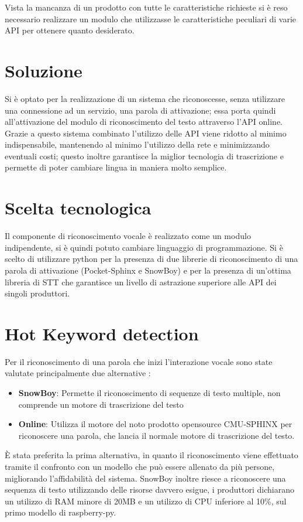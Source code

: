 \documentclass[twoside]{supsistudent}
\begin{document}
Vista la mancanza di un prodotto con tutte le caratteristiche richieste si è reso necessario realizzare un modulo che utilizzasse le caratteristiche peculiari di varie API per ottenere quanto desiderato.


\section{Soluzione}
Si è optato per la realizzazione di un sistema che riconoscesse, senza utilizzare una connessione ad un servizio, una parola di attivazione; essa porta quindi all'attivazione del modulo di riconoscimento del testo attraverso l'API online.\\
Grazie a questo sistema combinato l'utilizzo delle API viene ridotto al minimo indispensabile, mantenendo al minimo l'utilizzo della rete e minimizzando eventuali costi; questo inoltre garantisce la miglior tecnologia di trascrizione e permette di poter cambiare lingua in maniera molto semplice.
\section{Scelta tecnologica}
Il componente di riconoscimento vocale è realizzato come un modulo indipendente, si è quindi potuto cambiare linguaggio di programmazione.
Si è scelto di utilizzare python per la presenza di due librerie di riconoscimento di una parola di attivazione (Pocket-Sphinx e SnowBoy) e per la presenza di un'ottima libreria di STT che garantisce un livello di astrazione superiore alle API dei singoli produttori.\cite{snowboy}
\section{Hot Keyword detection}
Per il riconoscimento di una parola che inizi l'interazione vocale sono state valutate principalmente due alternative :
\begin{itemize}
	\item \textbf{SnowBoy}: Permette il riconoscimento di sequenze di testo multiple, non comprende un motore di trascrizione del testo \cite{snowboy}
	\item \textbf{Online}: Utilizza il motore del noto prodotto opensource CMU-SPHINX per riconoscere una parola, che lancia il normale motore di trascrizione del testo.\cite{cmusphinx}
\end{itemize}
È stata preferita la prima alternativa, in quanto il riconoscimento viene effettuato tramite il confronto con un modello che può essere allenato da più persone, migliorando l'affidabilità del sistema. SnowBoy inoltre riesce a riconoscere una sequenza di testo utilizzando delle risorse davvero esigue, i produttori dichiarano un utilizzo di RAM minore di 20MB e un utilizzo di CPU inferiore al 10\%,  sul primo modello di raspberry-py. \cite{snowboy-cpu-usage}
\end{document}
